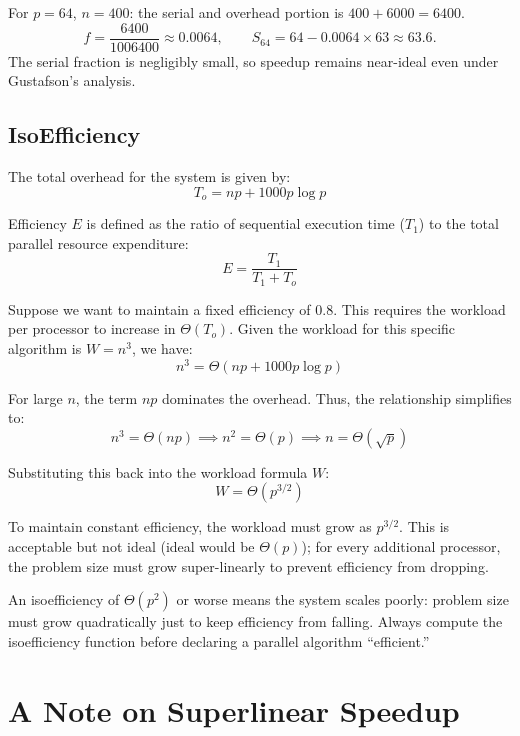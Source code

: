 For $p = 64$, $n = 400$: the serial and overhead portion is $400 + 6000 = 6400$.
\[
  f = \frac{6400}{1006400} \approx 0.0064,
  \qquad
  S_{64} = 64 - 0.0064 \times 63 \approx 63.6.
\]
The serial fraction is negligibly small, so speedup remains near-ideal even
under Gustafson's analysis.

\subsection{IsoEfficiency}

The total overhead for the system is given by:
\[ T_o = np + 1000p \log p \]

Efficiency $E$ is defined as the ratio of sequential execution time ($T_1$) to the total parallel resource expenditure:
\[ E = \frac{T_1}{T_1 + T_o} \]

Suppose we want to maintain a fixed efficiency of $0.8$. This requires the workload per processor to increase in $\Theta(T_o)$. Given the workload for this specific algorithm is $W = n^3$, we have:
\[ n^3 = \Theta(np + 1000p \log p) \]

For large $n$, the term $np$ dominates the overhead. Thus, the relationship simplifies to:
\[ n^3 = \Theta(np) \implies n^2 = \Theta(p) \implies n = \Theta(\sqrt{p}) \]

Substituting this back into the workload formula $W$:
\[ W = \Theta(p^{3/2}) \]

To maintain constant efficiency, the workload must grow as $p^{3/2}$. This is acceptable but not ideal (ideal would be $\Theta(p)$); for every additional processor, the problem size must grow super-linearly to prevent efficiency from dropping.
\begin{pppitfall}
An isoefficiency of $\Theta(p^2)$ or worse means the system scales poorly:
problem size must grow quadratically just to keep efficiency from falling.
Always compute the isoefficiency function before declaring a parallel
algorithm ``efficient.''
\end{pppitfall}

\section{A Note on Superlinear Speedup}

